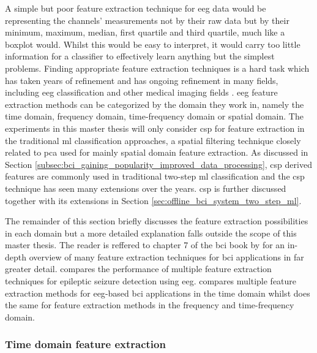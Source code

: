 A simple but poor feature extraction technique for \gls{eeg} data would be representing the channels' measurements not by their raw data but by their minimum, maximum, median, first quartile and third quartile, much like a boxplot would.
Whilst this would be easy to interpret, it would carry too little information for a classifier to effectively learn anything but the simplest problems.
Finding appropriate feature extraction techniques is a hard task which has taken years of refinement and has ongoing refinement in many fields, including \gls{eeg} classification and other medical imaging fields \citep{CAD_ml_dl_kbs}.
\gls{eeg} feature extraction methods can be categorized by the domain they work in, namely the time domain, frequency domain, time-frequency domain or spatial domain.
The experiments in this master thesis will only consider \gls{csp} for feature extraction in the traditional \gls{ml} classification approaches, a spatial filtering technique closely related to \gls{pca} used for mainly spatial domain feature extraction.
As discussed in Section \ref{subsec:bci_gaining_popularity_improved_data_processing}, \gls{csp} derived features are commonly used in traditional two-step \gls{ml} classification and the \gls{csp} technique has seen many extensions over the years.
\gls{csp} is further discussed together with its extensions in Section \ref{sec:offline_bci_system_two_step_ml}.

The remainder of this section briefly discusses the feature extraction possibilities in each domain but a more detailed explanation falls outside the scope of this master thesis.
The reader is reffered to chapter 7 of the \gls{bci} book by \citet{bci_book} for an in-depth overview of many feature extraction techniques for \gls{bci} applications in far greater detail.
 compares the performance of multiple feature extraction techniques for epileptic seizure detection using \gls{eeg}.
 compares multiple feature extraction methods for \gls{eeg}-based \gls{bci} applications in the time domain whilst \citet{timefreq_domain_eeg_features} does the same for feature extraction methods in the frequency and time-frequency domain.



\subsubsection{Time domain feature extraction}
\label{subsubsec:processing_signals_general_pipeline_features_timedomain}

